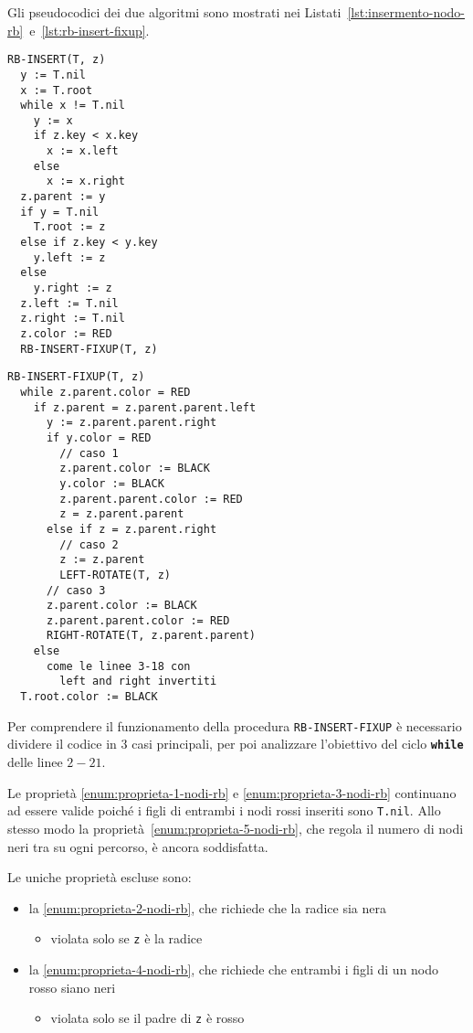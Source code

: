 \documentclass[italian, 10pt]{article}
\begin{document}
\bigskip
Gli pseudocodici dei due algoritmi sono mostrati nei Listati~\ref{lst:insermento-nodo-rb}~e~\ref{lst:rb-insert-fixup}.

\begin{minipage}[t]{0.445\textwidth}
  \begin{lstlisting}[style=pseudocode, caption={Inserimento in un RB}, label={lst:insermento-nodo-rb}]
RB-INSERT(T, z)
  y := T.nil
  x := T.root
  while x != T.nil
    y := x
    if z.key < x.key
      x := x.left
    else
      x := x.right
  z.parent := y
  if y = T.nil
    T.root := z
  else if z.key < y.key
    y.left := z
  else
    y.right := z
  z.left := T.nil
  z.right := T.nil
  z.color := RED
  RB-INSERT-FIXUP(T, z)
\end{lstlisting}
\end{minipage}
\begin{minipage}[t]{0.55\textwidth}
  \begin{lstlisting}[style=pseudocode, caption={Fixup dopo inserimento}, label={lst:rb-insert-fixup}]
RB-INSERT-FIXUP(T, z)
  while z.parent.color = RED
    if z.parent = z.parent.parent.left
      y := z.parent.parent.right
      if y.color = RED
        // caso 1
        z.parent.color := BLACK
        y.color := BLACK
        z.parent.parent.color := RED
        z = z.parent.parent
      else if z = z.parent.right
        // caso 2
        z := z.parent
        LEFT-ROTATE(T, z)
      // caso 3
      z.parent.color := BLACK
      z.parent.parent.color := RED
      RIGHT-ROTATE(T, z.parent.parent)
    else
      come le linee 3-18 con
        left and right invertiti
  T.root.color := BLACK
  \end{lstlisting}
\end{minipage}

Per comprendere il funzionamento della procedura \texttt{RB-INSERT-FIXUP} è necessario dividere il codice in \(3\) casi principali, per poi analizzare l'obiettivo del ciclo \textbf{\texttt{while}} delle linee \(2-21\).

Le proprietà \ref{enum:proprieta-1-nodi-rb} e \ref{enum:proprieta-3-nodi-rb} continuano ad essere valide poiché i figli di entrambi i nodi rossi inseriti sono \texttt{T.nil}.
Allo stesso modo la proprietà~\ref{enum:proprieta-5-nodi-rb}, che regola il numero di nodi neri tra su ogni percorso, è ancora soddisfatta.

Le uniche proprietà escluse sono:

\begin{itemize}
  \item la \ref{enum:proprieta-2-nodi-rb}, che richiede che la radice sia nera
        \begin{itemize}
          \item violata solo se \texttt{z} è la radice
        \end{itemize}
  \item la \ref{enum:proprieta-4-nodi-rb}, che richiede che entrambi i figli di un nodo rosso siano neri
        \begin{itemize}
          \item violata solo se il padre di \texttt{z} è rosso
        \end{itemize}
\end{itemize}
\end{document}
